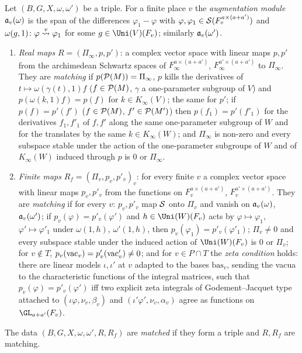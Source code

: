 \begin{definition}\label{pf:thmK:def:maps}
Let $(B,G,X,\omega,\omega')$ be a triple. For a finite place $v$ the \emph{augmentation module} $\mathfrak{a}_v(\omega)$ is the
span of the differences $\varphi_1-\varphi$ with $\varphi,\varphi_1\in\mathcal{S}(F_v^{a\times(a+a')})$ and
$\omega(g,1)\colon\varphi\mathrel{\stackrel{v}{\leadsto}}\varphi_1$ for some $g\in\Uni(V)(F_v)$; similarly $\mathfrak{a}_v(\omega')$.
\begin{enumerate}
\item \emph{Real maps} $R=(\Pi_\infty,p,p')$: a complex vector space with linear maps $p,p'$ from the archimedean
Schwartz spaces of $F_\infty^{a\times(a+a')}$, $F_\infty^{a'\times(a+a')}$ to $\Pi_\infty$. They are \emph{matching}
if $p(\mathcal{P}(M))=\Pi_\infty$, $p$ kills the derivatives of $t\mapsto\omega(\gamma(t),1)f$ ($f\in\mathcal{P}(M)$, $\gamma$ a
one-parameter subgroup of $V$) and $p(\omega(k,1)f)=p(f)$ for $k\in K_\infty(V)$; the same for $p'$; if $p(f)=p'(f')$
($f\in\mathcal{P}(M)$, $f'\in\mathcal{P}(M')$) then $p(f_1)=p'(f'_1)$ for the derivatives $f_1,f'_1$ of $f,f'$ along the same
one-parameter subgroup of $W$ and for the translates by the same $k\in K_\infty(W)$; and $\Pi_\infty$ is non-zero and every
subspace stable under the action of the one-parameter subgroups of $W$ and of $K_\infty(W)$ induced through $p$ is $0$ or
$\Pi_\infty$.
\item \emph{Finite maps} $R_f=(\Pi_v,p_v,p'_v)_v$: for every finite $v$ a complex vector space with linear maps
$p_v,p'_v$ from the functions on $F_v^{a\times(a+a')}$, $F_v^{a'\times(a+a')}$. They are \emph{matching} if for every
$v$: $p_v,p'_v$ map $\mathcal{S}$ onto $\Pi_v$ and vanish on $\mathfrak{a}_v(\omega)$, $\mathfrak{a}_v(\omega')$; if
$p_v(\varphi)=p'_v(\varphi')$ and $h\in\Uni(W)(F_v)$ acts by $\varphi\mapsto\varphi_1$, $\varphi'\mapsto\varphi'_1$
under $\omega(1,h)$, $\omega'(1,h)$, then $p_v(\varphi_1)=p'_v(\varphi'_1)$; $\Pi_v\ne0$ and every subspace stable under
the induced action of $\Uni(W)(F_v)$ is $0$ or $\Pi_v$; for $v\notin T$, $p_v(\mathrm{vac}_v)=p'_v(\mathrm{vac}'_v)\ne0$; and for
$v\in P\cap T$ the \emph{zeta condition} holds: there are linear models $\iota,\iota'$ at $v$ adapted to the bases
$\mathrm{bas}_v$, sending the vacua to the characteristic functions of the integral matrices, such that
$p_v(\varphi)=p'_v(\varphi')$ iff two explicit zeta integrals of Godement--Jacquet type \cite{GodementJacquet1972}
attached to $(\iota\varphi,\nu_v,\beta_v)$ and $(\iota'\varphi',\nu_v,\alpha_v)$ agree as functions on
$\GL_{a+a'}(F_v)$.
\end{enumerate}
The data $(B,G,X,\omega,\omega',R,R_f)$ are \emph{matched} if they form a triple and $R,R_f$ are matching.
\end{definition}

